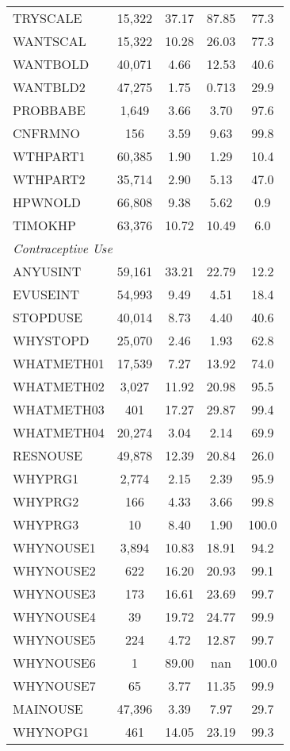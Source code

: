 \begin{longtable}{lcccc}
TRYSCALE & 15,322 & 37.17 & 87.85 & 77.3 \\
WANTSCAL & 15,322 & 10.28 & 26.03 & 77.3 \\
WANTBOLD & 40,071 & 4.66 & 12.53 & 40.6 \\
WANTBLD2 & 47,275 & 1.75 & 0.713 & 29.9 \\
PROBBABE & 1,649 & 3.66 & 3.70 & 97.6 \\
CNFRMNO & 156 & 3.59 & 9.63 & 99.8 \\
WTHPART1 & 60,385 & 1.90 & 1.29 & 10.4 \\
WTHPART2 & 35,714 & 2.90 & 5.13 & 47.0 \\
HPWNOLD & 66,808 & 9.38 & 5.62 & 0.9 \\
TIMOKHP & 63,376 & 10.72 & 10.49 & 6.0 \\
\hline
\multicolumn{5}{l}{\textit{Contraceptive Use}} \\
ANYUSINT & 59,161 & 33.21 & 22.79 & 12.2 \\
EVUSEINT & 54,993 & 9.49 & 4.51 & 18.4 \\
STOPDUSE & 40,014 & 8.73 & 4.40 & 40.6 \\
WHYSTOPD & 25,070 & 2.46 & 1.93 & 62.8 \\
WHATMETH01 & 17,539 & 7.27 & 13.92 & 74.0 \\
WHATMETH02 & 3,027 & 11.92 & 20.98 & 95.5 \\
WHATMETH03 & 401 & 17.27 & 29.87 & 99.4 \\
WHATMETH04 & 20,274 & 3.04 & 2.14 & 69.9 \\
RESNOUSE & 49,878 & 12.39 & 20.84 & 26.0 \\
WHYPRG1 & 2,774 & 2.15 & 2.39 & 95.9 \\
WHYPRG2 & 166 & 4.33 & 3.66 & 99.8 \\
WHYPRG3 & 10 & 8.40 & 1.90 & 100.0 \\
WHYNOUSE1 & 3,894 & 10.83 & 18.91 & 94.2 \\
WHYNOUSE2 & 622 & 16.20 & 20.93 & 99.1 \\
WHYNOUSE3 & 173 & 16.61 & 23.69 & 99.7 \\
WHYNOUSE4 & 39 & 19.72 & 24.77 & 99.9 \\
WHYNOUSE5 & 224 & 4.72 & 12.87 & 99.7 \\
WHYNOUSE6 & 1 & 89.00 & nan & 100.0 \\
WHYNOUSE7 & 65 & 3.77 & 11.35 & 99.9 \\
MAINOUSE & 47,396 & 3.39 & 7.97 & 29.7 \\
WHYNOPG1 & 461 & 14.05 & 23.19 & 99.3 \\

\end{longtable}

